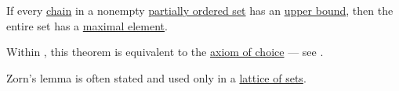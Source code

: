 \begin{lemma}\label{thm:zorns_lemma}
  If every \hyperref[def:partial_order_chain]{chain} in a nonempty \hyperref[def:partially_ordered_set]{partially ordered set} has an \hyperref[def:extremal_points/upper_and_lower_bounds]{upper bound}, then the entire set has a \hyperref[def:extremal_points/maximal_and_minimal_element]{maximal element}.
\end{lemma}
\begin{comments}
  \item Within \hyperref[def:zfc]{}, this theorem is equivalent to the \hyperref[def:zfc/choice]{axiom of choice} --- see .

  \item Zorn's lemma is often stated and used only in a \hyperref[thm:boolean_algebra_of_subsets]{lattice of sets}.
\end{comments}
